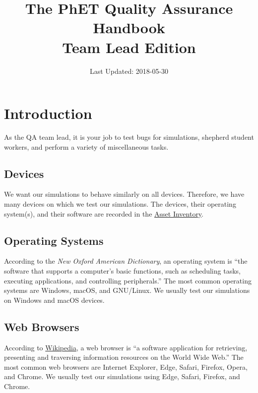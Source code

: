 \documentclass[titlepage]{article}
\title{The PhET Quality Assurance Handbook \\ Team Lead Edition}
\date{Last Updated: 2018-05-30}
\begin{document}
\maketitle

\tableofcontents

\pagebreak


\section{Introduction}

As the QA team lead, it is your job to test bugs for simulations, shepherd student workers, and perform a variety of miscellaneous tasks.

	\subsection{Devices}

We want our simulations to behave similarly on all devices. Therefore, we have many devices on which we test our simulations. The devices, their operating system(s), and their software are recorded in the \href{https://docs.google.com/spreadsheets/d/1XqnlW8DAlt2fZHDfDgkTMmMLpJZ1c0equBaPdkn2V08/edit#gid=0}{Asset Inventory}.

	\subsection{Operating Systems}

According to the \textit{New Oxford American Dictionary}, an operating system is ``the software that supports a computer's basic functions, such as scheduling tasks, executing applications, and controlling peripherals.'' The most common operating systems are Windows, macOS, and GNU/Linux. We usually test our simulations on Windows and macOS devices.

	\subsection{Web Browsers}

According to \href{https://en.wikipedia.org/wiki/Web_browser}{Wikipedia}, a web browser is ``a software application for retrieving, presenting and traversing information resources on the World Wide Web.'' The most common web browsers are Internet Explorer, Edge, Safari, Firefox, Opera, and Chrome. We usually test our simulations using Edge, Safari, Firefox, and Chrome.
\end{document}

